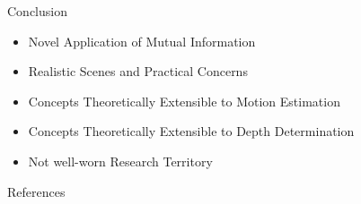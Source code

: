 \documentclass{beamer}
\begin{document}
\begin{frame}[c]{\sc Conclusion}
\begin{itemize}
\item Novel Application of Mutual Information
\item Realistic Scenes and Practical Concerns
\item Concepts Theoretically Extensible to Motion Estimation
\item Concepts Theoretically Extensible to Depth Determination
\item Not well-worn Research Territory
\end{itemize}
\end{frame}



\begin{frame}[allowframebreaks]{\sc References}
\tiny

\nocite{*}
\end{frame}

\end{document}
